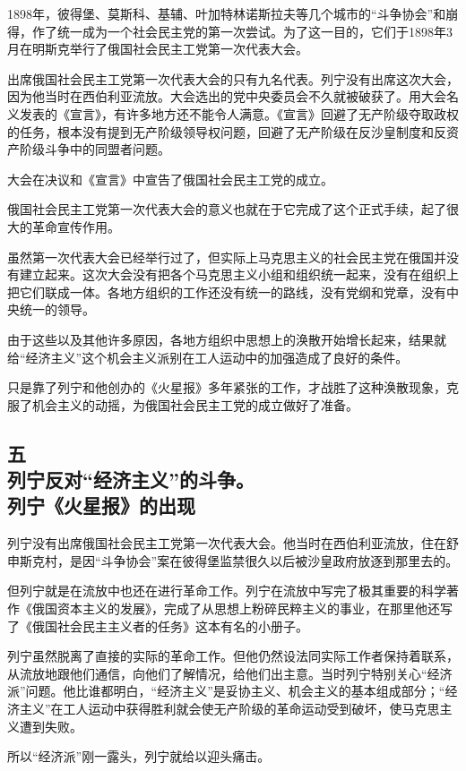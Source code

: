 1898年，彼得堡、莫斯科、基辅、叶加特林诺斯拉夫等几个城市的“斗争协会”和崩得，作了统一成为一个社会民主党的第一次尝试。为了这一目的，它们于1898年3月在明斯克举行了俄国社会民主工党第一次代表大会。

出席俄国社会民主工党第一次代表大会的只有九名代表。列宁没有出席这次大会，因为他当时在西伯利亚流放。大会选出的党中央委员会不久就被破获了。用大会名义发表的《宣言》，有许多地方还不能令人满意。《宣言》回避了无产阶级夺取政权的任务，根本没有提到无产阶级领导权问题，回避了无产阶级在反沙皇制度和反资产阶级斗争中的同盟者问题。

大会在决议和《宣言》中宣告了俄国社会民主工党的成立。

俄国社会民主工党第一次代表大会的意义也就在于它完成了这个正式手续，起了很大的革命宣传作用。

虽然第一次代表大会已经举行过了，但实际上马克思主义的社会民主党在俄国并没有建立起来。这次大会没有把各个马克思主义小组和组织统一起来，没有在组织上把它们联成一体。各地方组织的工作还没有统一的路线，没有党纲和党章，没有中央统一的领导。

由于这些以及其他许多原因，各地方组织中思想上的涣散开始增长起来，结果就给“经济主义”这个机会主义派别在工人运动中的加强造成了良好的条件。

只是靠了列宁和他创办的《火星报》多年紧张的工作，才战胜了这种涣散现象，克服了机会主义的动摇，为俄国社会民主工党的成立做好了准备。

\subsection[五\q 列宁反对“经济主义”的斗争。列宁《火星报》的出现]{五\\ 列宁反对“经济主义”的斗争。\\列宁《火星报》的出现}

列宁没有出席俄国社会民主工党第一次代表大会。他当时在西伯利亚流放，住在舒申斯克村，是因“斗争协会”案在彼得堡监禁很久以后被沙皇政府放逐到那里去的。

但列宁就是在流放中也还在进行革命工作。列宁在流放中写完了极其重要的科学著作《俄国资本主义的发展》，完成了从思想上粉碎民粹主义的事业，在那里他还写了《俄国社会民主主义者的任务》这本有名的小册子。

列宁虽然脱离了直接的实际的革命工作。但他仍然设法同实际工作者保持着联系，从流放地跟他们通信，向他们了解情况，给他们出主意。当时列宁特别关心“经济派”问题。他比谁都明白，“经济主义”是妥协主义、机会主义的基本组成部分；“经济主义”在工人运动中获得胜利就会使无产阶级的革命运动受到破坏，使马克思主义遭到失败。

所以“经济派”刚一露头，列宁就给以迎头痛击。

